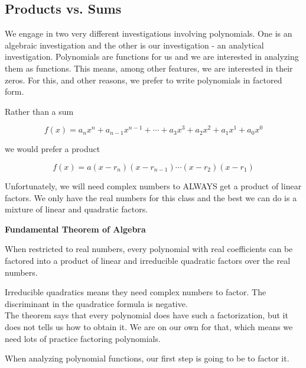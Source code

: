 \documentclass{ximera}
\begin{document}
\subsection{Products vs. Sums}


We engage in two very different investigations involving polynomials.  One is an algebraic investigation and the other is our investigation - an analytical investigation.  Polynomials are functions for us and we are interested in analyzing them as functions.  This means, among other features, we are interested in their zeros.  For this, and other reasons, we prefer to write polynomials in factored form.



Rather than a sum

\[   f(x) = a_n x^n + a_{n-1} x^{n-1} + \cdots + a_3 x^3 + a_2 x^2 + a_1 x^1 + a_0 x^0      \]

we would prefer a product

\[   f(x) = a (x-r_n)(x-r_{n-1})  \cdots (x-r_2)(x-r_1)  \]





Unfortunately, we will need complex numbers to ALWAYS get a product of linear factors.  We only have the real numbers for this class and the best we can do is a mixture of linear and quadratic factors.



\begin{theorem} \textbf{\textcolor{green!50!black}{Fundamental Theorem of Algebra}}

When restricted to real numbers, every polynomial with real coefficients can be factored into a product of linear and irreducible quadratic factors over the real numbers.

\end{theorem}


Irreducible quadratics means they need complex numbers to factor. The discriminant in the quadratice formula is negative. \\



The theorem says that every polynomial does have such a factorization, but it does not tells us how to obtain it.  We are on our own for that, which means we need lots of practice factoring polynomials.

When analyzing polynomial functions, our first step is going to be to factor it.
\end{document}
